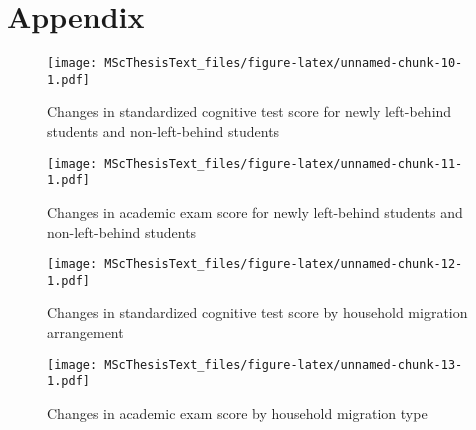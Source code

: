\documentclass[
  man,floatsintext]{apa7}
\begin{document}
\newpage

\hypertarget{appendix}{%
\section{Appendix}\label{appendix}}

\begin{figure}
\centering
\texttt{[image: MScThesisText\_files/figure-latex/unnamed-chunk-10-1.pdf]}
\caption{\label{fig:unnamed-chunk-10}Changes in standardized cognitive test score for newly left-behind students and non-left-behind students}
\end{figure}

\newpage

\begin{figure}
\centering
\texttt{[image: MScThesisText\_files/figure-latex/unnamed-chunk-11-1.pdf]}
\caption{\label{fig:unnamed-chunk-11}Changes in academic exam score for newly left-behind students and non-left-behind students}
\end{figure}

\newpage

\begin{figure}
\centering
\texttt{[image: MScThesisText\_files/figure-latex/unnamed-chunk-12-1.pdf]}
\caption{\label{fig:unnamed-chunk-12}Changes in standardized cognitive test score by household migration arrangement}
\end{figure}

\newpage

\begin{figure}
\centering
\texttt{[image: MScThesisText\_files/figure-latex/unnamed-chunk-13-1.pdf]}
\caption{\label{fig:unnamed-chunk-13}Changes in academic exam score by household migration type}
\end{figure}

\newpage
\end{document}
